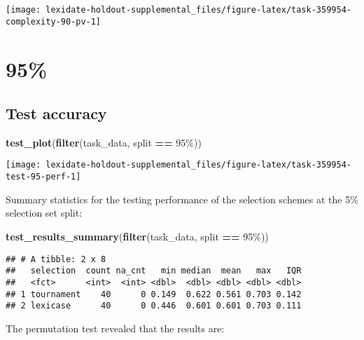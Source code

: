 \documentclass[
]{book}
\newenvironment{Shaded}{\begin{snugshade}}{\end{snugshade}}
\newcommand{\FunctionTok}[1]{\textcolor[rgb]{0.13,0.29,0.53}{\textbf{#1}}}
\newcommand{\NormalTok}[1]{#1}
\newcommand{\SpecialCharTok}[1]{\textcolor[rgb]{0.81,0.36,0.00}{\textbf{#1}}}
\newcommand{\StringTok}[1]{\textcolor[rgb]{0.31,0.60,0.02}{#1}}
\begin{document}
\texttt{[image: lexidate-holdout-supplemental\_files/figure-latex/task-359954-complexity-90-pv-1]}

\hypertarget{section-9}{%
\section{95\%}\label{section-9}}

\hypertarget{test-accuracy-9}{%
\subsection{Test accuracy}\label{test-accuracy-9}}

\begin{Shaded}
\begin{Highlighting}[]
\FunctionTok{test\_plot}\NormalTok{(}\FunctionTok{filter}\NormalTok{(task\_data, split }\SpecialCharTok{==} \StringTok{\textquotesingle{}95\%\textquotesingle{}}\NormalTok{))}
\end{Highlighting}
\end{Shaded}

\texttt{[image: lexidate-holdout-supplemental\_files/figure-latex/task-359954-test-95-perf-1]}

Summary statistics for the testing performance of the selection schemes at the 5\% selection set split:

\begin{Shaded}
\begin{Highlighting}[]
\FunctionTok{test\_results\_summary}\NormalTok{(}\FunctionTok{filter}\NormalTok{(task\_data, split }\SpecialCharTok{==} \StringTok{\textquotesingle{}95\%\textquotesingle{}}\NormalTok{))}
\end{Highlighting}
\end{Shaded}

\begin{verbatim}
## # A tibble: 2 x 8
##   selection  count na_cnt   min median  mean   max   IQR
##   <fct>      <int>  <int> <dbl>  <dbl> <dbl> <dbl> <dbl>
## 1 tournament    40      0 0.149  0.622 0.561 0.703 0.142
## 2 lexicase      40      0 0.446  0.601 0.601 0.703 0.111
\end{verbatim}

The permutation test revealed that the results are:
\end{document}
